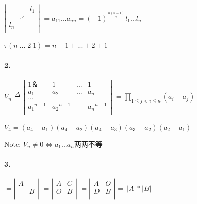 \documentclass[printbox]{BHCexam}
\begin{document}
$\left|
\begin{array}{ccc}
   &  & l_1 \\  %
   & \iddots & \\  %
   l_n &  & \\  %
  \end{array}\right|$ 
$=a_{11}...a_{nn}=(-1)^{\frac{n(n-1)}{2}}l_1...l_n$



$\tau(n\;...\;2\;1)=n-1+...+2+1$


\paragraph{2.}
$V_n{\substack{\Delta\\=}}\left|\begin{array}{cccc}
   1＆  &1 & ... & 1\\  %
  a_{1} & a_{2} &... & a_{n}\\  %
...\\
  {a_1}^{n-1} &  {a_2}^{n-1}& &{a_n}^{n-1}\\  %
\end{array}\right|$ 
$=\prod_{1\leq j < i \leq n } (a_i - a_j)$

$V_4=(a_4-a_1)(a_4-a_2)(a_4-a_3)(a_3-a_2)(a_2-a_1)$

Note: $V_n \neq 0 \Longleftrightarrow a_1...a_n$两两不等

\paragraph{3.}
$=\left|
\begin{array}{cc}
  A &   \\  %
   &   B\\  %
\end{array}\right|$ 
$=\left|
\begin{array}{cc}
  A &  C \\  %
  O &   B\\  %
\end{array}\right|$ 
$=\left|
\begin{array}{cc}
  A &  O \\  %
  D &   B\\  %
\end{array}\right|$
=~$|A|*|B|$~
\end{document}
